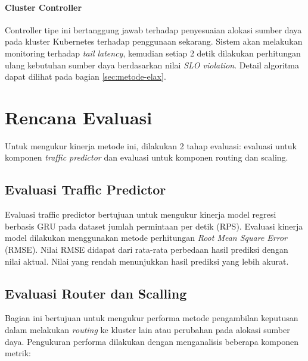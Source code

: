 \paragraph{Cluster Controller}

Controller tipe ini bertanggung jawab terhadap penyesuaian alokasi sumber daya pada kluster Kubernetes terhadap penggunaan sekarang. Sistem akan melakukan monitoring terhadap \emph{tail latency}, kemudian setiap 2 detik dilakukan perhitungan ulang kebutuhan sumber daya berdasarkan nilai \emph{SLO violation}. Detail algoritma dapat dilihat pada bagian \ref{sec:metode-elax}.

\section{Rencana Evaluasi}
\label{sec:rencana-evaluasi}

Untuk mengukur kinerja metode ini, dilakukan 2 tahap evaluasi: evaluasi untuk komponen \emph{traffic predictor} dan evaluasi untuk komponen routing dan scaling.

\subsection{Evaluasi Traffic Predictor}

Evaluasi traffic predictor bertujuan untuk mengukur kinerja model regresi berbasis GRU pada dataset jumlah permintaan per detik (RPS). Evaluasi kinerja model dilakukan menggunakan metode perhitungan \emph{Root Mean Square Error} (RMSE). Nilai RMSE didapat dari rata-rata perbedaan hasil prediksi dengan nilai aktual. Nilai yang rendah menunjukkan hasil prediksi yang lebih akurat.

\subsection{Evaluasi Router dan Scalling}

Bagian ini bertujuan untuk mengukur performa metode pengambilan keputusan dalam melakukan \emph{routing} ke kluster lain atau perubahan pada alokasi sumber daya. Pengukuran performa dilakukan dengan menganalisis beberapa komponen metrik:

